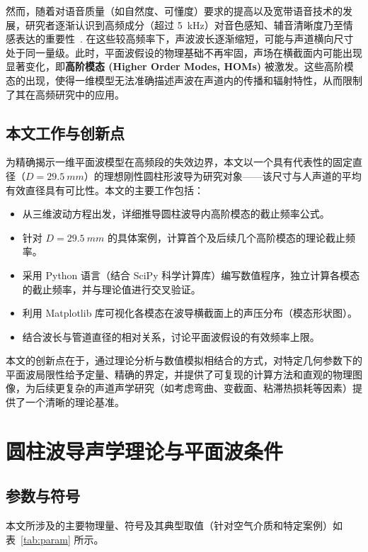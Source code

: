 \documentclass[12pt,a4paper]{article}
\begin{document}
然而，随着对语音质量（如自然度、可懂度）要求的提高以及宽带语音技术的发展，研究者逐渐认识到高频成分（超过 \SI{5}{\kilo\hertz}）对音色感知、辅音清晰度乃至情感表达的重要性~\cite{bib:Monson2014HighFreq, bib:Vampola2015HighFreqSpeech}. 在这些较高频率下，声波波长逐渐缩短，可能与声道横向尺寸处于同一量级。此时，平面波假设的物理基础不再牢固，声场在横截面内可能出现显著变化，即\textbf{高阶模态 (Higher Order Modes, HOMs)} 被激发。这些高阶模态的出现，使得一维模型无法准确描述声波在声道内的传播和辐射特性，从而限制了其在高频研究中的应用。

\subsection{本文工作与创新点}
为精确揭示一维平面波模型在高频段的失效边界，本文以一个具有代表性的固定直径（$D=\SI{29.5}{mm}$）的理想刚性圆柱形波导为研究对象——该尺寸与人声道的平均有效直径具有可比性。本文的主要工作包括：
\begin{itemize}
    \item 从三维波动方程出发，详细推导圆柱波导内高阶模态的截止频率公式。
    \item 针对 $D=\SI{29.5}{mm}$ 的具体案例，计算首个及后续几个高阶模态的理论截止频率。
    \item 采用 Python 语言（结合 SciPy 科学计算库）编写数值程序，独立计算各模态的截止频率，并与理论值进行交叉验证。
    \item 利用 Matplotlib 库可视化各模态在波导横截面上的声压分布（模态形状图）。
    \item 结合波长与管道直径的相对关系，讨论平面波假设的有效频率上限。
\end{itemize}
本文的创新点在于，通过理论分析与数值模拟相结合的方式，对特定几何参数下的平面波局限性给予定量、精确的界定，并提供了可复现的计算方法和直观的物理图像，为后续更复杂的声道声学研究（如考虑弯曲、变截面、粘滞热损耗等因素）提供了一个清晰的理论基准。

\section{圆柱波导声学理论与平面波条件}

\subsection{参数与符号}
本文所涉及的主要物理量、符号及其典型取值（针对空气介质和特定案例）如表~\ref{tab:param} 所示。
\end{document}

